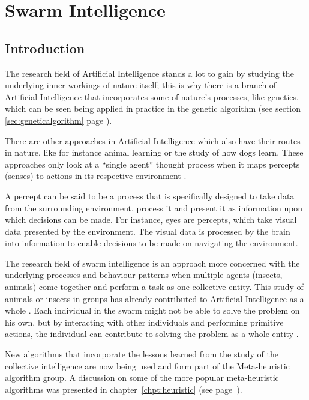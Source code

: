\chapter{Swarm Intelligence}
\label{chpt:swarm}
\section{Introduction}
The research field of Artificial Intelligence stands a lot to gain by studying the underlying inner workings of nature itself; this is why there is a branch of Artificial Intelligence that incorporates some of nature’s processes, like genetics, which can be seen being applied in practice in the genetic algorithm (see section \ref{sec:geneticalgorithm} page \pageref{sec:geneticalgorithm}).

 There are other approaches in Artificial Intelligence which also have their routes in nature, like for instance animal learning or the study of how dogs learn\cite{DLearning}. These approaches only look at a “single agent” thought process when it maps percepts (senses) to actions in its respective environment \cite{DLearning}. 
 
 A percept can be said to be a process that is specifically designed to take data from the surrounding environment, process it and present it as information upon which decisions can be made\cite{DLearning,AIModernApproach}. For instance, eyes are percepts, which take visual data presented by the environment\cite{DLearning,AIModernApproach}. The visual data is processed by the brain into information to enable decisions to be made on navigating the environment\cite{DLearning,AIModernApproach}.

The research field of swarm intelligence is an approach more concerned with the underlying processes and behaviour patterns when multiple agents (insects, animals) come together and perform a task as one collective entity\cite{DLearning,AIModernApproach,ChaoticSwarmIntel,BeeJobShop}.  This study of animals or insects in groups has already contributed to Artificial Intelligence as a whole \cite{ChaoticSwarmIntel,BeeJobShop}. Each individual in the swarm might not be able to solve the problem on his own, but by interacting with other individuals and performing primitive actions, the individual can contribute to solving the problem as a whole entity \cite{BeeJobShop}. 

New algorithms that incorporate the lessons learned from the study of the collective intelligence are now being used and form part of the Meta-heuristic algorithm group. A discussion on some of the more popular meta-heuristic algorithms was presented in chapter~\ref{chpt:heuristic} (see page~\pageref{chpt:heuristic}).

